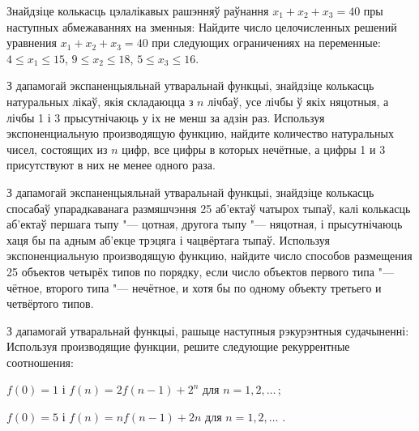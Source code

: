 \begin{problemList}
\bigskip

\problemItemWithCommonPart
{Знайдзіце колькасць цэлалікавых рашэнняў раўнання $x_1 + x_2 + x_3 = 40$ пры наступных
абмежаваннях на зменныя:}
{Найдите число целочисленных решений уравнения $x_1 + x_2 + x_3 = 40$ при
следующих ограничениях на переменные:}
{$4 \le x_1 \le 15$, $9 \le x_2 \le 18$, $5 \le x_3 \le 16$.}

\bigskip

\problemItemSimple
{З дапамогай экспаненцыяльнай утваральнай функцыі, знайдзіце колькасць натуральных лікаў,
якія складаюцца з $n$ лічбаў, усе лічбы ў якіх няцотныя, а лічбы 1 і 3 прысутнічаюць у іх
не менш за адзін раз.}
{Используя экспоненциальную производящую функцию, найдите количество
натуральных чисел, состоящих из $n$ цифр, все цифры в которых нечётные, а цифры 1 и 3
присутствуют в них не менее одного раза.}

\bigskip

\problemItemSimple
{З дапамогай экспаненцыяльнай утваральнай функцыі, знайдзіце колькасць спосабаў упарадкаванага размяшчэння
25 аб'ектаў чатырох тыпаў, калі колькасць аб'ектаў першага тыпу "--- цотная, другога тыпу "--- няцотная,
і прысутнічаюць хаця бы па адным аб'екце трэцяга і чацвёртага тыпаў.}
{Используя экспоненциальную производящую функцию, найдите число способов
размещения 25 объектов четырёх типов по порядку, если число объектов первого
типа "--- чётное, второго типа "--- нечётное, и хотя бы по одному объекту третьего и
четвёртого типов.}

\bigskip

\problemItemWithCommonPart
{З дапамогай утваральнай функцыі, рашыце наступныя рэкурэнтныя судачыненні:}
{Используя производящие функции, решите следующие рекуррентные соотношения:}
{\begin{belarusianEnumerate}
  \item $f(0) = 1$ і $f(n) = 2f(n - 1) + 2^n$ для $n = 1, 2, \ldots\, $;
  \item $f(0) = 5$ і $f(n) = nf(n - 1) + 2n$ для $n = 1, 2, \ldots\,\, $.
\end{belarusianEnumerate}}

\end{problemList}


